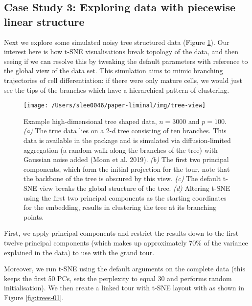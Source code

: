 \documentclass[article,notitle]{jdssv}
\begin{document}
\hypertarget{case-study-3-exploring-data-with-piecewise-linear-structure}{%
\subsection{Case Study 3: Exploring data with piecewise linear structure}\label{case-study-3-exploring-data-with-piecewise-linear-structure}}

Next we explore some simulated noisy tree structured data (Figure
\ref{fig:fake-trees}). Our interest here is how t-SNE visualisations break
topology of the data, and then seeing if we can resolve this by tweaking the
default parameters with reference to the global view of the data set.
This simulation aims to mimic branching trajectories of cell differentiation:
if there were only mature cells, we would just see the tips of the branches
which have a hierarchical pattern of clustering.



\begin{figure}

{\centering \texttt{[image: /Users/slee0046/paper-liminal/img/tree-view]} 

}

\caption{Example high-dimensional tree shaped data, \(n = 3000\) and \(p = 100\). \emph{(a)} The true data lies on a 2-\(d\) tree consisting of ten branches. This data is available in the  package and is simulated via diffusion-limited aggregation (a random walk along the branches of the tree) with Gaussian noise added (Moon et al. 2019). \emph{(b)} The first two principal components, which form the initial projection for the tour, note that the backbone of the tree is obscured by this view. \emph{(c)} The default t-SNE view breaks the global structure of the tree. \emph{(d)} Altering t-SNE using the first two principal components as the starting coordinates for the embedding, results in clustering the tree at its branching points.}\label{fig:fake-trees}
\end{figure}

First, we apply principal components and restrict the results down to the first
twelve principal components (which makes up approximately 70\% of the variance
explained in the data) to use with the grand tour.

Moreover, we run t-SNE using the default arguments on the complete data (this
keeps the first 50 PCs, sets the perplexity to equal 30 and performs random
initialisation). We then create a linked
tour with t-SNE layout with  as shown in Figure \ref{fig:trees-01}.
\end{document}
